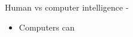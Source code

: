 %
%
%


\begin{frame}[t,allowframebreaks]{Human vs computer intelligence -} 

\begin{itemize}
\item Computers can 
\end{itemize}

\end{frame}